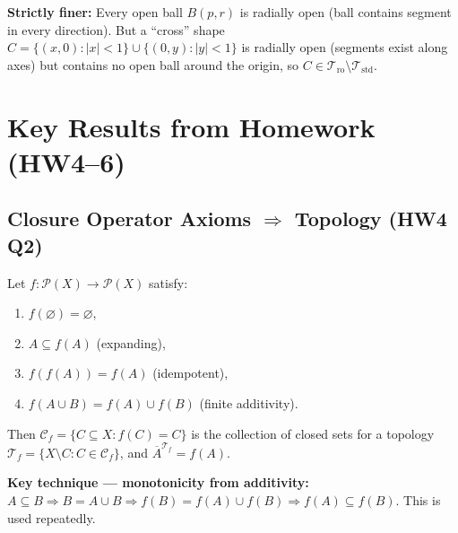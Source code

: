 \documentclass{article}
\begin{document}
\textbf{Strictly finer:} Every open ball $B(p,r)$ is radially open
(ball contains segment in every direction). But a ``cross'' shape
$C = \{(x,0) : |x|<1\} \cup \{(0,y) : |y|<1\}$ is radially open
(segments exist along axes) but contains no open ball around the origin,
so $C \in \mathcal{T}_{\mathrm{ro}} \setminus \mathcal{T}_{\mathrm{std}}$.

\section{Key Results from Homework (HW4--6)}

\subsection{Closure Operator Axioms $\Rightarrow$ Topology (HW4 Q2)}
\begin{theorem}
  Let $f : \mathcal{P}(X) \to \mathcal{P}(X)$ satisfy:
  \begin{enumerate}
    \item $f(\varnothing) = \varnothing$,
    \item $A \subseteq f(A)$ (expanding),
    \item $f(f(A)) = f(A)$ (idempotent),
    \item $f(A \cup B) = f(A) \cup f(B)$ (finite additivity).
  \end{enumerate}
  Then $\mathcal{C}_f = \{C \subseteq X : f(C) = C\}$ is the
  collection of closed sets for a topology $\mathcal{T}_f = \{X
  \setminus C : C \in \mathcal{C}_f\}$, and
  $\overline{A}^{\mathcal{T}_f} = f(A)$.
\end{theorem}
\textbf{Key technique --- monotonicity from additivity:} $A \subseteq
B \Rightarrow B = A \cup B \Rightarrow f(B) = f(A) \cup f(B)
\Rightarrow f(A) \subseteq f(B)$. This is used repeatedly.
\end{document}

